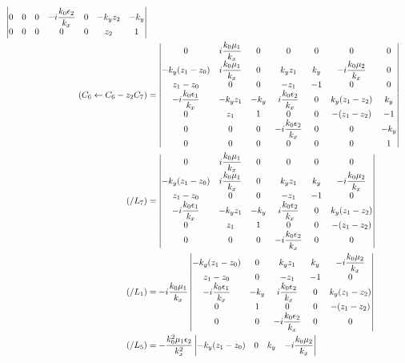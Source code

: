 {\begin{itshape}
\begin{align*}
\begin{vmatrix}
  0 & 0 & 0 & -i\dfrac{k_0\epsilon_2}{k_x} & 0 & -k_y z_2 & -k_y
  \\
  0 & 0 & 0 & 0 & 0 & z_2 & 1
  \end{vmatrix}
  \\
  ( C_6 \leftarrow C_6 - z_2 C_7 ) &=
  \begin{vmatrix}
  0 & i\dfrac{k_0\mu_1}{k_x} & 0 & 0 & 0 & 0 & 0
  \\
  -{k_y} (z_1-z_0) &  i\dfrac{k_0\mu_1}{k_x} & 0 & k_y z_1 & k_y & -i\dfrac{k_0\mu_2}{k_x} & 0
  \\
  z_1-z_0 & 0 & 0 & -z_1 & -1 & 0 & 0
  \\
  -i\dfrac{k_0\epsilon_1}{k_x} & -k_y z_1 & - k_y & i\dfrac{k_0\epsilon_2}{k_x} & 0 & k_y (z_1-z_2) & k_y
  \\
  0 & z_1 & 1 & 0 & 0 & -(z_1-z_2) & -1
  \\
  0 & 0 & 0 & -i\dfrac{k_0\epsilon_2}{k_x} & 0 & 0 & -k_y
  \\
  0 & 0 & 0 & 0 & 0 & 0 & 1
  \end{vmatrix}
  \\
  ( / L_7 ) &=
  \begin{vmatrix}
  0 & i\dfrac{k_0\mu_1}{k_x} & 0 & 0 & 0 & 0
  \\
  -{k_y} (z_1-z_0) &  i\dfrac{k_0\mu_1}{k_x} & 0 & k_y z_1 & k_y & -i\dfrac{k_0\mu_2}{k_x}
  \\
  z_1-z_0 & 0 & 0 & -z_1 & -1 & 0
  \\
  -i\dfrac{k_0\epsilon_1}{k_x} & -k_y z_1 & - k_y & i\dfrac{k_0\epsilon_2}{k_x} & 0 & k_y (z_1-z_2)
  \\
  0 & z_1 & 1 & 0 & 0 & -(z_1-z_2)
  \\
  0 & 0 & 0 & -i\dfrac{k_0\epsilon_2}{k_x} & 0 & 0
  \end{vmatrix}
  \\
  ( / L_1 ) &= -i\dfrac{k_0\mu_1}{k_x}
  \begin{vmatrix} 
  -{k_y} (z_1-z_0) & 0 & k_y z_1 & k_y & -i\dfrac{k_0\mu_2}{k_x}
  \\
  z_1-z_0 & 0 & -z_1 & -1 & 0
  \\
  -i\dfrac{k_0\epsilon_1}{k_x} & - k_y & i\dfrac{k_0\epsilon_2}{k_x} & 0 & k_y (z_1-z_2)
  \\
  0 & 1 & 0 & 0 & -(z_1-z_2)
  \\
  0 & 0 & -i\dfrac{k_0\epsilon_2}{k_x} & 0 & 0
  \end{vmatrix}
  \\
  ( / L_5 ) &= -\dfrac{k_0^2\mu_1\epsilon_2}{k_x^2}
  \begin{vmatrix} 
  -{k_y} (z_1-z_0) & 0 & k_y & -i\dfrac{k_0\mu_2}{k_x}

\end{vmatrix}
\end{align*}
\end{itshape}}
